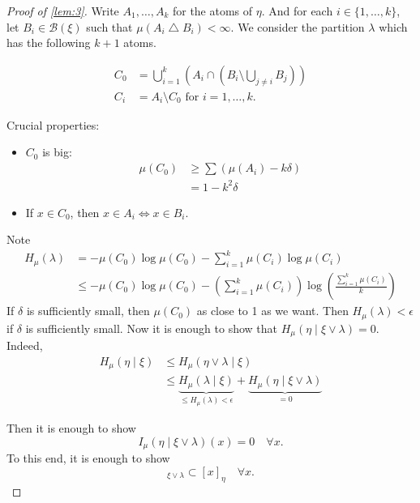 \documentclass{article}
\newcommand{\sym}{\bigtriangleup}
\begin{document}
\begin{proof}[Proof of \cref{lem:3}]
  Write $A_1, \dotsc, A_k$ for the atoms of $\eta$.
  And for each $i \in \{1, \dotsc, k\}$, let $B_i \in \mathcal{B}(\xi)$ such that $\mu(A_i \sym B_i) < \infty$.
  We consider the partition $\lambda$ which has the following $k+1$ atoms.

  \begin{align*}
    C_0 &= \bigcup_{i=1}^k (A_i \cap (B_i \setminus \bigcup_{j\neq i} B_j)) \\
    C_i &= A_i \setminus C_0 \text{ for } i = 1, \dotsc, k.
  \end{align*}

  Crucial properties:
  \begin{itemize}[label=--]
    \item $C_0$ is big:
      \begin{align*}
        \mu(C_0) &\geq \sum (\mu(A_i) - k \delta) \\
        &= 1 - k^2 \delta
      \end{align*}
    \item If $x \in C_0$, then $x \in A_i \iff x \in B_i$.
  \end{itemize}
  Note
  \begin{align*}
    H_\mu(\lambda) &= -\mu(C_0) \log \mu(C_0) - \sum_{i=1}^k \mu(C_i) \log \mu(C_i) \\
                   &\leq -\mu(C_0) \log \mu(C_0) - (\sum_{i=1}^k\mu(C_i) ) \log(\frac{\sum_{i=1}^k \mu(C_i)}{k})
  \end{align*}
  If $\delta$ is sufficiently small, then $\mu(C_0)$ as close to 1 as we want.
  Then $H_\mu(\lambda) < \epsilon$ if $\delta$ is sufficiently small.
  Now it is enough to show that $H_\mu(\eta \mid \xi \vee \lambda) = 0$.
  Indeed,
  \begin{align*}
    H_\mu(\eta \mid \xi) &\leq H_\mu(\eta \vee \lambda \mid \xi) \\
                         &\leq \underbrace{H_\mu(\lambda \mid \xi)}_{\leq H_\mu(\lambda) < \epsilon} + \underbrace{H_\mu(\eta \mid \xi \vee \lambda)}_{=0}
  \end{align*}

  Then it is enough to show
  \begin{equation*}
    I_\mu(\eta \mid \xi \vee \lambda)(x) = 0 \quad \forall x.
  \end{equation*}
  To this end, it is enough to show
  \begin{equation*}
    [x]_{\xi \vee \lambda} \subset [x]_\eta \quad \forall x.
  \end{equation*}


\end{proof}
\end{document}
